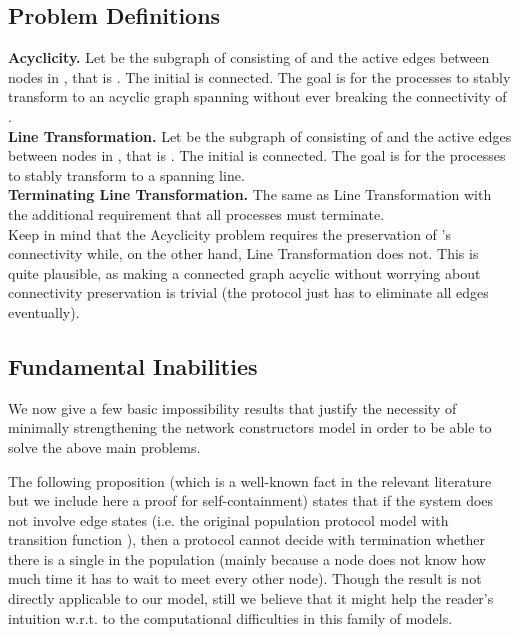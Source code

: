 \documentclass[preprint]{elsarticle}
\begin{document}
\subsection{Problem Definitions}
\label{subsec:problems}

\noindent\textbf{Acyclicity.} Let  be the subgraph of  consisting of  and the active edges between nodes in , that is . The initial  is connected. The goal is for the processes to stably transform  to an acyclic graph spanning  without ever breaking the connectivity of .\\

\noindent\textbf{Line Transformation.} Let  be the subgraph of  consisting of  and the active edges between nodes in , that is . The initial  is connected. The goal is for the processes to stably transform  to a spanning line.\\

\noindent\textbf{Terminating Line Transformation.} The same as Line Transformation with the additional requirement that all processes must terminate.\\

Keep in mind that the Acyclicity problem requires the preservation of 's connectivity while, on the other hand, Line Transformation does not. This is quite plausible, as making a connected graph acyclic without worrying about connectivity preservation is trivial (the protocol just has to eliminate all edges eventually).

\subsection{Fundamental Inabilities}
\label{subsec:fi}

We now give a few basic impossibility results that justify the necessity of minimally strengthening the network constructors model in order to be able to solve the above main problems.  

The following proposition (which is a well-known fact in the relevant literature but we include here a proof for self-containment) states that if the system does not involve edge states (i.e. the original population protocol model with transition function ), then a protocol cannot decide with termination whether there is a single  in the population (mainly because a node does not know how much time it has to wait to meet every other node). Though the result is not directly applicable to our model, still we believe that it might help the reader's intuition w.r.t. to the computational difficulties in this family of models.
\end{document}
